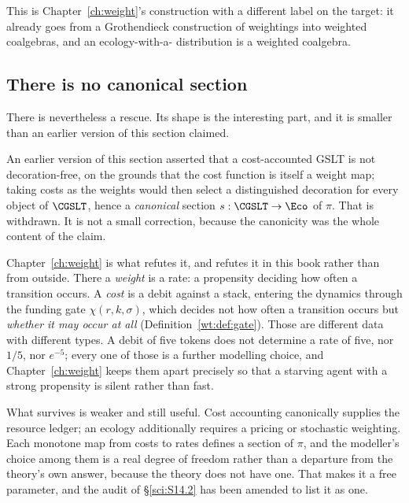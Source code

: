 This is Chapter~\ref{ch:weight}'s construction with a different label on the target: it already goes
from a Grothendieck construction of weightings into weighted coalgebras, and an ecology-with-a-
distribution is a weighted coalgebra.

\subsection{There is no canonical section}\label{sci:S15.2}

There is nevertheless a rescue. Its shape is the interesting part, and it is smaller than an earlier
version of this section claimed.

\begin{remark}
\label{sci:prop:section}
An earlier version of this section asserted that a cost-accounted GSLT is not decoration-free, on the
grounds that the cost function is itself a weight map; taking costs as the weights would then select a
distinguished decoration for every object of $\CGSLT$, hence a \emph{canonical} section
$s : \CGSLT \to \Eco$ of $\pi$. That is withdrawn. It is not a small correction, because the
canonicity was the whole content of the claim.

Chapter~\ref{ch:weight} is what refutes it, and refutes it in this book rather than from outside.
There a \emph{weight} is a rate: a propensity deciding how often a transition occurs. A \emph{cost}
is a debit against a stack, entering the dynamics through the funding gate $\chi(r,k,\sigma)$, which
decides not how often a transition occurs but \emph{whether it may occur at all}
(Definition~\ref{wt:def:gate}). Those are different data with different types. A debit of five tokens
does not determine a rate of five, nor $1/5$, nor $e^{-5}$; every one of those is a further modelling
choice, and Chapter~\ref{ch:weight} keeps them apart precisely so that a starving agent with a strong
propensity is silent rather than fast.
\end{remark}

What survives is weaker and still useful. Cost accounting canonically supplies the resource ledger; an
ecology additionally requires a pricing or stochastic weighting. Each monotone map from costs to rates
defines a section of $\pi$, and the modeller's choice among them is a real degree of freedom rather
than a departure from the theory's own answer, because the theory does not have one. That makes it a
free parameter, and the audit of \S\ref{sci:S14.2} has been amended to list it as one.


